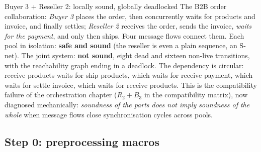 \begin{examplebox}{Buyer 3 + Reseller 2: locally sound, globally deadlocked}
The B2B order collaboration: \emph{Buyer 3} places the order, then concurrently waits for products and invoice, and finally settles; \emph{Reseller 2} receives the order, sends the invoice, \emph{waits for the payment}, and only then ships. Four message flows connect them. Each pool in isolation: \textbf{safe and sound} (the reseller is even a plain sequence, an S-net). The joint system: \textbf{not sound}, eight dead and sixteen non-live transitions, with the reachability graph ending in a deadlock. The dependency is circular: \textsf{receive products} waits for \textsf{ship products}, which waits for \textsf{receive payment}, which waits for \textsf{settle invoice}, which waits for \textsf{receive products}. This is the compatibility failure of the orchestration chapter ($R_2 + B_3$ in the compatibility matrix), now diagnosed mechanically: \emph{soundness of the parts does not imply soundness of the whole} when message flows close synchronisation cycles across pools.
\end{examplebox}

\subsection{Step 0: preprocessing macros}

